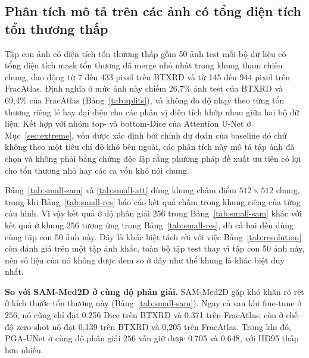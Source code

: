 \documentclass[11pt]{article}
\begin{document}
\subsection{Phân tích mô tả trên các ảnh có tổng diện tích tổn thương thấp}
\label{sec:small}
Tập con ảnh có diện tích tổn thương thấp gồm 50 ảnh test mỗi bộ dữ liệu có tổng diện tích mask tổn thương đã merge nhỏ nhất trong khung tham chiếu chung, dao động từ 7 đến 433 pixel trên BTXRD và từ 145 đến 944 pixel trên FracAtlas. Định nghĩa ở mức ảnh này chiếm 26,7\% ảnh test của BTXRD và 69,4\% của FracAtlas (Bảng~\ref{tab:splits}), và không đo độ nhạy theo từng tổn thương riêng lẻ hay đại diện cho các phân vị diện tích khớp nhau giữa hai bộ dữ liệu. Kết hợp với nhóm top- và bottom-Dice của Attention U-Net ở Mục~\ref{sec:extreme}, vốn được xác định bởi chính dự đoán của baseline đó chứ không theo một tiêu chí độ khó bên ngoài, các phân tích này mô tả tập ảnh đã chọn và không phải bằng chứng độc lập rằng phương pháp đề xuất ưu tiên có lợi cho tổn thương nhỏ hay các ca vốn khó nói chung.

Bảng~\ref{tab:small-sam} và \ref{tab:small-att} dùng khung chấm điểm $512\times512$ chung, trong khi Bảng~\ref{tab:small-res} báo cáo kết quả chấm trong khung riêng của từng cấu hình. Vì vậy kết quả ở độ phân giải $256$ trong Bảng~\ref{tab:small-sam} khác với kết quả ở khung $256$ tương ứng trong Bảng~\ref{tab:small-res}, dù cả hai đều dùng cùng tập con 50 ảnh này. Đây là khác biệt tách rời với việc Bảng~\ref{tab:resolution} còn đánh giá trên một tập ảnh khác, toàn bộ tập test thay vì tập con 50 ảnh này, nên số liệu của nó không được đem so ở đây như thể khung là khác biệt duy nhất.

\textbf{So với SAM-Med2D ở cùng độ phân giải.} SAM-Med2D gặp khó khăn rõ rệt ở kích thước tổn thương này (Bảng~\ref{tab:small-sam}). Ngay cả sau khi fine-tune ở $256$, nó cũng chỉ đạt 0.256 Dice trên BTXRD và 0.371 trên FracAtlas; còn ở chế độ zero-shot nó đạt 0,139 trên BTXRD và 0,205 trên FracAtlas. Trong khi đó, PGA-UNet ở cùng độ phân giải $256$ vẫn giữ được 0.705 và 0.648, với HD95 thấp hơn nhiều.
\end{document}
